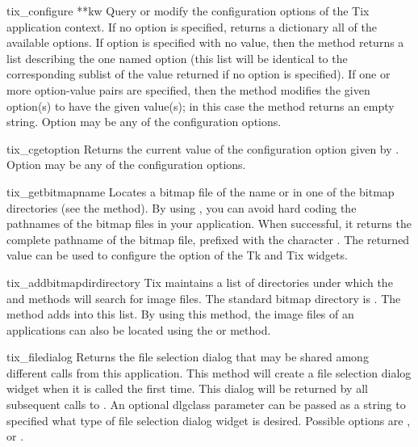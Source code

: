 \begin{methoddesc}{tix_configure}{ **kw}
Query or modify the configuration options of the Tix application
context. If no option is specified, returns a dictionary all of the
available options.  If option is specified with no value, then the
method returns a list describing the one named option (this list will
be identical to the corresponding sublist of the value returned if no
option is specified).  If one or more option-value pairs are
specified, then the method modifies the given option(s) to have the
given value(s); in this case the method returns an empty string.
Option may be any of the configuration options.
\end{methoddesc}

\begin{methoddesc}{tix_cget}{option}
Returns the current value of the configuration option given by
. Option may be any of the configuration options.
\end{methoddesc}

\begin{methoddesc}{tix_getbitmap}{name}
Locates a bitmap file of the name  or  in
one of the bitmap directories (see the 
method).  By using , you can avoid hard
coding the pathnames of the bitmap files in your application. When
successful, it returns the complete pathname of the bitmap file,
prefixed with the character .  The returned value can be used to
configure the  option of the Tk and Tix widgets.
\end{methoddesc}

\begin{methoddesc}{tix_addbitmapdir}{directory}
Tix maintains a list of directories under which the
 and  methods will
search for image files.  The standard bitmap directory is
. The  method
adds  into this list. By using this method, the image
files of an applications can also be located using the
 or  method.
\end{methoddesc}

\begin{methoddesc}{tix_filedialog}{}
Returns the file selection dialog that may be shared among different
calls from this application.  This method will create a file selection
dialog widget when it is called the first time. This dialog will be
returned by all subsequent calls to .  An
optional dlgclass parameter can be passed as a string to specified
what type of file selection dialog widget is desired.  Possible
options are ,  or
.
\end{methoddesc}


